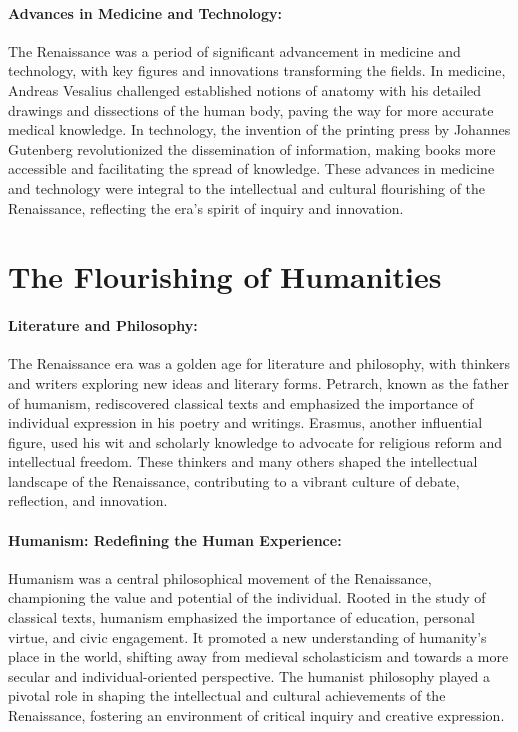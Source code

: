 \documentclass[a4paper,12pt]{book}
\begin{document}
\paragraph{Advances in Medicine and Technology:}
The Renaissance was a period of significant advancement in medicine and technology, with key figures and innovations transforming the fields. In medicine, Andreas Vesalius challenged established notions of anatomy with his detailed drawings and dissections of the human body, paving the way for more accurate medical knowledge. In technology, the invention of the printing press by Johannes Gutenberg revolutionized the dissemination of information, making books more accessible and facilitating the spread of knowledge. These advances in medicine and technology were integral to the intellectual and cultural flourishing of the Renaissance, reflecting the era's spirit of inquiry and innovation.

\section*{The Flourishing of Humanities}

\paragraph{Literature and Philosophy:}
The Renaissance era was a golden age for literature and philosophy, with thinkers and writers exploring new ideas and literary forms. Petrarch, known as the father of humanism, rediscovered classical texts and emphasized the importance of individual expression in his poetry and writings. Erasmus, another influential figure, used his wit and scholarly knowledge to advocate for religious reform and intellectual freedom. These thinkers and many others shaped the intellectual landscape of the Renaissance, contributing to a vibrant culture of debate, reflection, and innovation.

\paragraph{Humanism: Redefining the Human Experience:}
Humanism was a central philosophical movement of the Renaissance, championing the value and potential of the individual. Rooted in the study of classical texts, humanism emphasized the importance of education, personal virtue, and civic engagement. It promoted a new understanding of humanity’s place in the world, shifting away from medieval scholasticism and towards a more secular and individual-oriented perspective. The humanist philosophy played a pivotal role in shaping the intellectual and cultural achievements of the Renaissance, fostering an environment of critical inquiry and creative expression.
\end{document}
